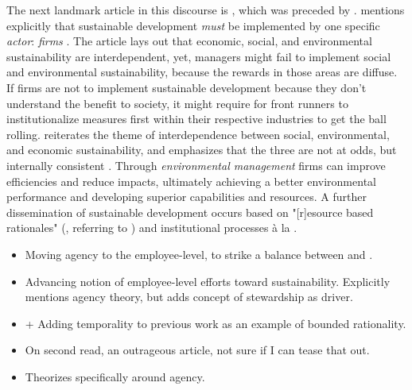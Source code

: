 The next landmark article in this discourse is \citet{Bansal2005}, which was preceded by \citet{Bansal2002}. 
\citet{Bansal2002} mentions explicitly that sustainable development \textit{must} be implemented by one specific \textit{actor}: \textit{firms} \citep[p. 124]{Bansal2002}. 
The article lays out that economic, social, and environmental sustainability are interdependent, yet, managers might fail to implement social and environmental sustainability, because the rewards in those areas are diffuse. If firms are not to implement sustainable development because they don't understand the benefit to society, it might require for front runners to institutionalize measures first within their respective industries to get the ball rolling.
\citet{Bansal2005} reiterates the theme of interdependence between social, environmental, and economic sustainability, and emphasizes that the three are not at odds, but internally consistent \citep[. 197]{Bansal2005}. Through \textit{environmental management} firms can improve efficiencies and reduce impacts, ultimately achieving a better environmental performance and developing superior capabilities and resources. A further dissemination of sustainable development occurs based on "[r]esource based rationales" (\citealp[p. 200]{Bansal2005}, referring to \citealp{Barney1991a}) and institutional processes à la \citet{Meyer1977}.

\begin{itemize}
	\item \citet{Haugh2010}
		\subitem Moving agency to the employee-level, to strike a balance between \citet{Friedman1962} and \citet{Freeman1984}.
	\item \citet{Hernandez2012}
		\subitem Advancing notion of employee-level efforts toward sustainability. Explicitly mentions agency theory, but adds concept of stewardship as driver.
	\item \citet{Bansal2014} + \citet{Slawinski2015}
		\subitem Adding temporality to previous work as an example of bounded rationality.
	\item \citet{Hahn2014} 
		\subitem On second read, an outrageous article, not sure if I can tease that out.
	\item \citet{Heikkurinen2019}
		\subitem Theorizes specifically around agency.
\end{itemize}


